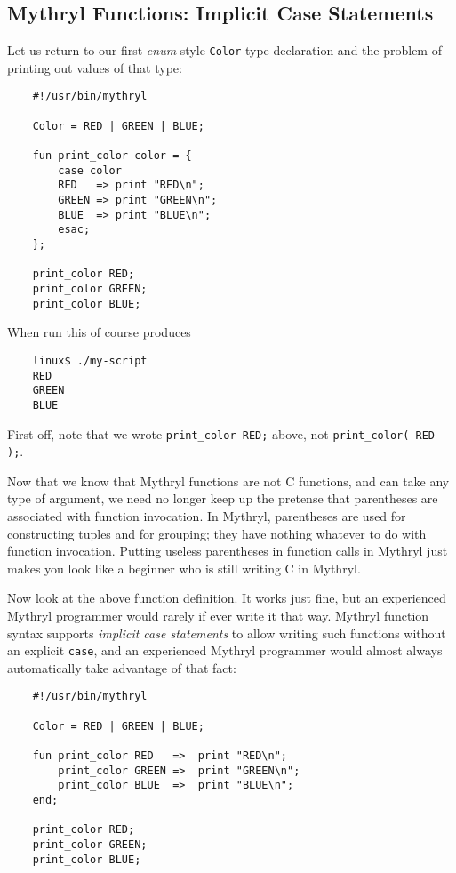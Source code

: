 \subsection{Mythryl Functions:  Implicit Case Statements}

Let us return to our first {\it enum}-style {\tt Color} type declaration and 
the problem of printing out values of that type:

\begin{verbatim}
    #!/usr/bin/mythryl

    Color = RED | GREEN | BLUE;

    fun print_color color = {
        case color
        RED   => print "RED\n";
        GREEN => print "GREEN\n";
        BLUE  => print "BLUE\n";
        esac;
    };

    print_color RED;
    print_color GREEN;
    print_color BLUE;
\end{verbatim}

When run this of course produces

\begin{verbatim}
    linux$ ./my-script
    RED
    GREEN
    BLUE
\end{verbatim}

First off, note that we wrote {\tt print\_color RED;} above, not 
{\tt print\_color( RED );}.

Now that we know that Mythryl functions are not C functions, and can 
take any type of argument, we need no longer keep up the pretense that 
parentheses are associated with function invocation.  In Mythryl, 
parentheses are used for constructing tuples and for grouping; they 
have nothing whatever to do with function invocation.  Putting 
useless parentheses in function calls in Mythryl just makes you look 
like a beginner who is still writing C in Mythryl.

Now look at the above function definition.  It works just fine, but 
an experienced Mythryl programmer would rarely if ever write it that 
way.  Mythryl function syntax supports {\it implicit case statements} 
to allow writing such functions without an explicit {\tt case}, and 
an experienced Mythryl programmer would almost always automatically 
take advantage of that fact:

\begin{verbatim}
    #!/usr/bin/mythryl

    Color = RED | GREEN | BLUE;

    fun print_color RED   =>  print "RED\n";
        print_color GREEN =>  print "GREEN\n";
        print_color BLUE  =>  print "BLUE\n";
    end;

    print_color RED;
    print_color GREEN;
    print_color BLUE;
\end{verbatim}

